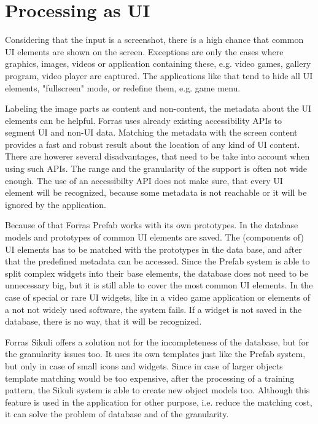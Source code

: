 \documentclass[draft,final]{vutinfth} %
\begin{document}
\section{Processing as UI}
Considering that the input is a screenshot, there is a high chance that common UI elements are shown on the screen.
Exceptions are only the cases where graphics, images, videos or application containing these, e.g. video games, gallery program, video player are captured.
The applications like that tend to hide all UI elements, "fullscreen" mode, or redefine them, e.g. game menu.\par
Labeling the image parts as content and non-content, the metadata about the UI elements can be helpful.
Forras uses already existing accessibility APIs to segment UI and non-UI data. 
Matching the metadata with the screen content provides a fast and robust result about the location of any kind of UI content.
There are howerer several disadvantages, that need to be take into account when using such APIs.
The range and the granularity of the support is often not wide enough.
The use of an accessibilty API does not make sure, that every UI element will be recognized, because some metadata is not reachable or it will be ignored by the application.\par
Because of that Forras Prefab works with its own prototypes. 
In the database models and  prototypes of common UI elements are saved.
The (components of) UI elements has to be matched with the prototypes in the data base, and after that the predefined metadata can be accessed.
Since the Prefab system is able to split complex widgets into their base elements, the database does not need to be unnecessary big, but it is still able to cover the most common UI elements.
In the case of special or rare UI widgets, like in a video game application or elements of a not not widely used software, the system fails.
If a widget is not saved in the database, there is no way, that it will be recognized.\par
Forras Sikuli offers a solution not for the incompleteness of the database, but for the granularity issues too.
It uses its own templates just like the Prefab system, but only in case of small icons and widgets.
Since in case of larger objects template matching would be too expensive, after the processing of a training pattern, the Sikuli system is able to create new object models too.
Although this feature is used in the application for other purpose, i.e. reduce the matching cost, it can solve the problem of database and of the granularity.
\end{document}
